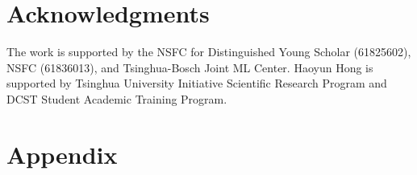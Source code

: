\documentclass[sigconf]{acmart}
\theoremstyle{definition}
\begin{document}

%
\maketitle









\section*{Acknowledgments}
The work is supported by the NSFC for Distinguished Young Scholar (61825602), NSFC (61836013), and Tsinghua-Bosch Joint ML Center.
Haoyun Hong is supported by Tsinghua University Initiative Scientific
Research Program and DCST Student Academic Training Program. 


\renewcommand\refname{REFERENCES}



\clearpage

\appendix

\section{Appendix}


\end{document}
